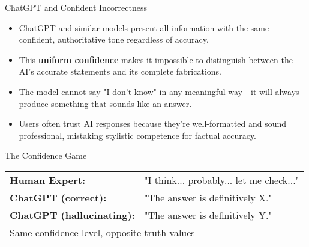 \documentclass{beamer}
\begin{document}
	\begin{frame}{ChatGPT and Confident Incorrectness}
		\begin{itemize}
			\item ChatGPT and similar models present all information with the same confident, authoritative tone regardless of accuracy.
			\item This \textbf{uniform confidence} makes it impossible to distinguish between the AI's accurate statements and its complete fabrications.
			\item The model cannot say "I don't know" in any meaningful way—it will always produce something that sounds like an answer.
			\item Users often trust AI responses because they're well-formatted and sound professional, mistaking stylistic competence for factual accuracy.
		\end{itemize}
		
		\begin{block}{The Confidence Game}
			\begin{tabular}{ll}
				\textbf{Human Expert:} & "I think... probably... let me check..." \\
				\textbf{ChatGPT (correct):} & "The answer is definitively X." \\
				\textbf{ChatGPT (hallucinating):} & "The answer is definitively Y." \\
				\multicolumn{2}{l}{Same confidence level, opposite truth values}
			\end{tabular}
		\end{block}
	\end{frame}
	
\end{document}
